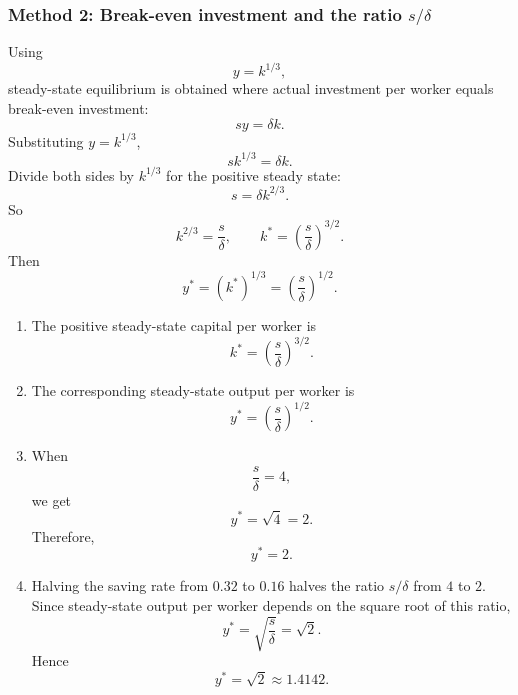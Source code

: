 \documentclass[12pt]{article}
\begin{document}
\subsubsection{Method 2: Break-even investment and the ratio \(s/\delta\)}
Using
\[
y=k^{1/3},
\]
steady-state equilibrium is obtained where actual investment per worker equals break-even investment:
\[
s y=\delta k.
\]
Substituting \(y=k^{1/3}\),
\[
s k^{1/3}=\delta k.
\]
Divide both sides by \(k^{1/3}\) for the positive steady state:
\[
s=\delta k^{2/3}.
\]
So
\[
k^{2/3}=\frac{s}{\delta},
\qquad
k^*=\left(\frac{s}{\delta}\right)^{3/2}.
\]
Then
\[
y^*=(k^*)^{1/3}=\left(\frac{s}{\delta}\right)^{1/2}.
\]

\begin{enumerate}[label=(\alph*)]
    \item
    The positive steady-state capital per worker is
    \[
    \boxed{k^*=\left(\frac{s}{\delta}\right)^{3/2}.}
    \]

    \item
    The corresponding steady-state output per worker is
    \[
    \boxed{y^*=\left(\frac{s}{\delta}\right)^{1/2}.}
    \]

    \item
    When
    \[
    \frac{s}{\delta}=4,
    \]
    we get
    \[
    y^*=\sqrt{4}=2.
    \]
    Therefore,
    \[
    \boxed{y^*=2.}
    \]

    \item
    Halving the saving rate from \(0.32\) to \(0.16\) halves the ratio \(s/\delta\) from \(4\) to \(2\). Since steady-state output per worker depends on the square root of this ratio,
    \[
    y^*=\sqrt{\frac{s}{\delta}}=\sqrt{2}.
    \]
    Hence
    \[
    \boxed{y^*=\sqrt{2}\approx 1.4142.}
    \]
\end{enumerate}

\begin{center}
\end{center}
\end{document}
